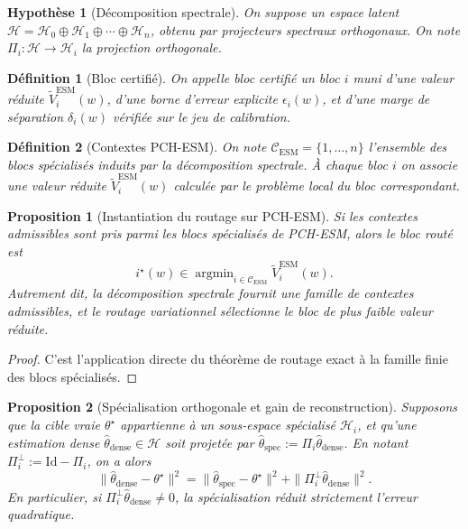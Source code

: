 \documentclass[11pt,a4paper]{article}
\newtheorem{definition}{Définition}[section]
\newtheorem{assumption}{Hypothèse}[section]
\newtheorem{proposition}{Proposition}[section]
\DeclareMathOperator{\argmin}{argmin}
\newcommand{\Hh}{\mathcal H}
\newcommand{\Ccal}{\mathcal C}
\begin{document}
\begin{assumption}[Décomposition spectrale]
On suppose un espace latent \(\Hh=\Hh_0\oplus \Hh_1\oplus\cdots\oplus \Hh_n\), obtenu par projecteurs spectraux orthogonaux. On note \(\Pi_i:\Hh\to\Hh_i\) la projection orthogonale.
\end{assumption}

\begin{definition}[Bloc certifié]
On appelle bloc certifié un bloc \(i\) muni d'une valeur réduite \(\widetilde V_i^{\mathrm{ESM}}(w)\), d'une borne d'erreur explicite \(\epsilon_i(w)\), et d'une marge de séparation \(\delta_i(w)\) vérifiée sur le jeu de calibration.
\end{definition}

\begin{definition}[Contextes PCH-ESM]
On note \(\Ccal_{\mathrm{ESM}}=\{1,\dots,n\}\) l'ensemble des blocs spécialisés induits par la décomposition spectrale. À chaque bloc \(i\) on associe une valeur réduite \(\widetilde V_i^{\mathrm{ESM}}(w)\) calculée par le problème local du bloc correspondant.
\end{definition}

\begin{proposition}[Instantiation du routage sur PCH-ESM]
Si les contextes admissibles sont pris parmi les blocs spécialisés de PCH-ESM, alors le bloc routé est
\[
i^\star(w)\in\argmin_{i\in\Ccal_{\mathrm{ESM}}}\widetilde V_i^{\mathrm{ESM}}(w).
\]
Autrement dit, la décomposition spectrale fournit une famille de contextes admissibles, et le routage variationnel sélectionne le bloc de plus faible valeur réduite.
\end{proposition}

\begin{proof}
C'est l'application directe du théorème de routage exact à la famille finie des blocs spécialisés.
\end{proof}

\begin{proposition}[Spécialisation orthogonale et gain de reconstruction]
Supposons que la cible vraie \(\theta^\star\) appartienne à un sous-espace spécialisé \(\Hh_i\), et qu'une estimation dense \(\hat\theta_{\mathrm{dense}}\in\Hh\) soit projetée par \(\hat\theta_{\mathrm{spec}}:=\Pi_i\hat\theta_{\mathrm{dense}}\). En notant \(\Pi_i^\perp:=\mathrm{Id}-\Pi_i\), on a alors
\[
\|\hat\theta_{\mathrm{dense}}-\theta^\star\|^2
=
\|\hat\theta_{\mathrm{spec}}-\theta^\star\|^2
+
\|\Pi_i^\perp \hat\theta_{\mathrm{dense}}\|^2.
\]
En particulier, si \(\Pi_i^\perp \hat\theta_{\mathrm{dense}}\neq 0\), la spécialisation réduit strictement l'erreur quadratique.
\end{proposition}
\end{document}
